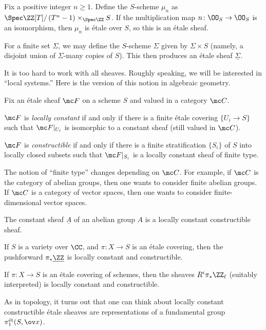 \documentclass[../notes.tex]{subfiles}
\begin{document}
\begin{example}
	Fix a positive integer $n\ge1$. Define the $S$-scheme $\mu_n$ as $\Spec\ZZ[T]/\left(T^n-1\right)\times_{\Spec\ZZ}S$. If the multiplication map $n\colon\OO_S\to\OO_S$ is an isomorphism, then $\mu_n$ is \'etale over $S$, so this is an \'etale sheaf.
\end{example}
\begin{example}
	For a finite set $\Sigma$, we may define the $S$-scheme $\Sigma$ given by $\Sigma\times S$ (namely, a disjoint union of $\Sigma$-many copies of $S$). This then produces an \'etale sheaf $\underline\Sigma$.
\end{example}
It is too hard to work with all sheaves. Roughly speaking, we will be interested in ``local systems.'' Here is the version of this notion in algebraic geometry.
\begin{defihelper}  
	Fix an \'etale sheaf $\mc F$ on a scheme $S$ and valued in a category $\mc C$.
	\begin{listalph}
		\item $\mc F$ is \textit{locally constant} if and only if there is a finite \'etale covering $\{U_i\to S\}$ such that $\mc F|_{U_i}$ is isomorphic to a constant sheaf (still valued in $\mc C$).
		\item $\mc F$ is \textit{constructible} if and only if there is a finite stratification $\{S_i\}$ of $S$ into locally closed subsets such that $\mc F|_{S_i}$ is a locally constant sheaf of finite type.
	\end{listalph}
\end{defihelper}
\begin{remark}
	The notion of ``finite type'' changes depending on $\mc C$. For example, if $\mc C$ is the category of abelian groups, then one wants to consider finite abelian groups. If $\mc C$ is a category of vector spaces, then one wants to consider finite-dimensional vector spaces.
\end{remark}
\begin{example}
	The constant sheaf $\underline A$ of an abelian group $A$ is a locally constant constructible sheaf.
\end{example}
\begin{example}
	If $S$ is a variety over $\CC$, and $\pi\colon X\to S$ is an \'etale covering, then the pushforward $\pi_*\underline{\ZZ}$ is locally constant and constructible.
\end{example}
\begin{example}
	If $\pi\colon X\to S$ is an \'etale covering of schemes, then the sheaves $R^i\pi_*\ZZ_\ell$ (suitably interpreted) is locally constant and constructible.
\end{example}
\begin{remark}
	As in topology, it turns out that one can think about locally constant constructible \'etale sheaves are representations of a fundamental group $\pi_1^{\mathrm{\acute et}}(S,\ov x)$.
\end{remark}
\end{document}
